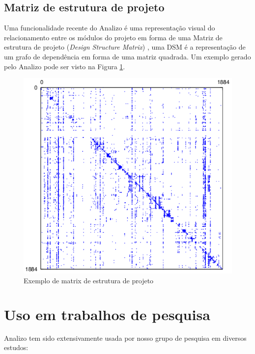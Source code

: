 \documentclass{article}
\begin{document}
\subsection{Matriz de estrutura de projeto}

Uma funcionalidade recente do Analizo é uma representação visual do
relacionamento entre os módulos do projeto em forma de uma Matriz de estrutura
de projeto ({\it Design Structure Matrix}) \cite{Maccormack2006}, uma DSM é a
representação de um grafo de dependência em forma de uma matriz quadrada. Um
exemplo gerado pelo Analizo pode ser visto na Figura \ref{sample-dsm}.

\begin{figure}[h]
\center
\includegraphics[scale=0.3]{sample-dsm.png}
\caption{Exemplo de matrix de estrutura de projeto}
\label{sample-dsm}
\end{figure}

\section{Uso em trabalhos de pesquisa}

Analizo tem sido extensivamente usada por nosso grupo de pesquisa em diversos
estudos:
\end{document}
